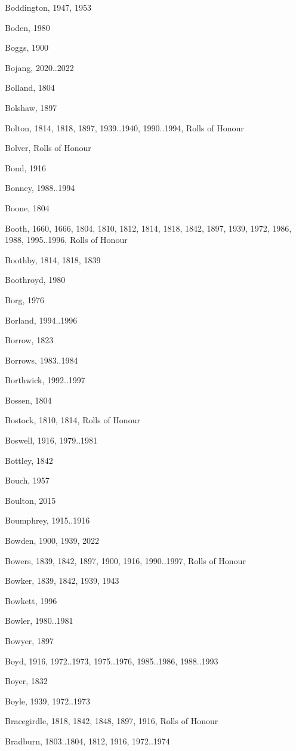 \begin{theindex}
\item Boddington, 1947, 1953
\item Boden, 1980
\item Boggs, 1900
\item Bojang, 2020..2022
\item Bolland, 1804
\item Bolshaw, 1897
\item Bolton, 1814, 1818, 1897, 1939..1940, 1990..1994, Rolls of Honour
\item Bolver, Rolls of Honour
\item Bond, 1916
\item Bonney, 1988..1994
\item Boone, 1804
\item Booth, 1660, 1666, 1804, 1810, 1812, 1814, 1818, 1842, 1897, 1939, 1972, 1986, 1988, 1995..1996, Rolls of Honour
\item Boothby, 1814, 1818, 1839
\item Boothroyd, 1980
\item Borg, 1976
\item Borland, 1994..1996
\item Borrow, 1823
\item Borrows, 1983..1984
\item Borthwick, 1992..1997
\item Bossen, 1804
\item Bostock, 1810, 1814, Rolls of Honour
\item Boswell, 1916, 1979..1981
\item Bottley, 1842
\item Bouch, 1957
\item Boulton, 2015
\item Boumphrey, 1915..1916
\item Bowden, 1900, 1939, 2022
\item Bowers, 1839, 1842, 1897, 1900, 1916, 1990..1997, Rolls of Honour
\item Bowker, 1839, 1842, 1939, 1943
\item Bowkett, 1996
\item Bowler, 1980..1981
\item Bowyer, 1897
\item Boyd, 1916, 1972..1973, 1975..1976, 1985..1986, 1988..1993
\item Boyer, 1832
\item Boyle, 1939, 1972..1973
\item Bracegirdle, 1818, 1842, 1848, 1897, 1916, Rolls of Honour
\item Bradburn, 1803..1804, 1812, 1916, 1972..1974

\end{theindex}
